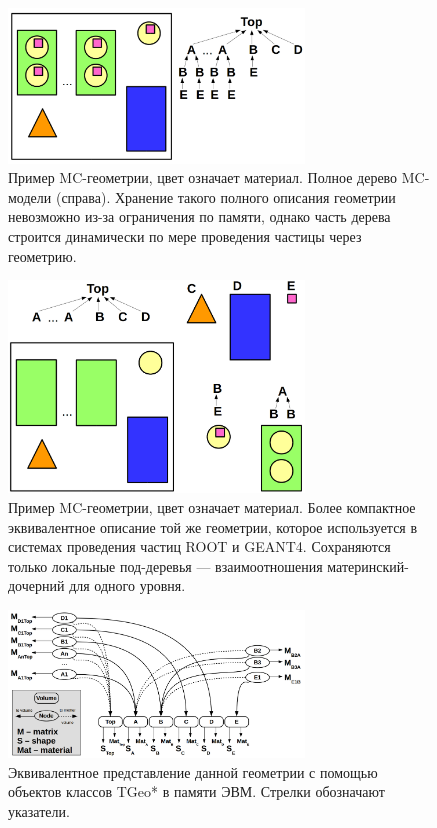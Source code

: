 \begin{figure}[H]
\centering
\includegraphics[width=0.7\textwidth]{pictures/ROOT_geo1.png}
\caption{Пример MC-геометрии, цвет означает материал. Полное дерево MC-модели (справа). Хранение такого полного описания геометрии невозможно из-за ограничения по памяти, однако часть дерева строится динамически по мере проведения частицы через геометрию.} %
\label{fig:ROOTgeo1}
\end{figure}

\begin{figure}[H]
\centering
\includegraphics[width=0.7\textwidth]{pictures/ROOT_geo2.png}
\caption{Пример MC-геометрии, цвет означает материал. Более компактное эквивалентное описание той же геометрии, которое используется в системах проведения частиц ROOT и GEANT4. Сохраняются только локальные под-деревья --- взаимоотношения материнский-дочерний для одного уровня.} %
\label{fig:ROOTgeo2}
\end{figure}

\begin{figure}[H]
\centering
\includegraphics[width=0.7\textwidth]{pictures/ROOT_geo3.png}
\caption{ Эквивалентное представление данной геометрии с помощью объектов классов TGeo* в памяти ЭВМ. Стрелки обозначают указатели.} %
\label{fig:ROOTgeo3}
\end{figure}

